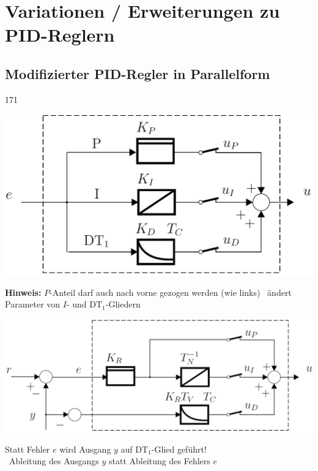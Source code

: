\section{Variationen / Erweiterungen zu PID-Reglern}

\subsection{Modifizierter PID-Regler in Parallelform}{171}

\begin{minipage}[t]{0.4\columnwidth}
    \begin{center}
        \textbf{}
    \end{center}
    \includegraphics[width=\columnwidth]{images/pid_regler_aufbau.png}

    \textbf{Hinweis:} $P$-Anteil darf auch nach vorne gezogen werden (wie links) 
    \textrightarrow\ ändert Parameter von $I$- und $\text{DT}_1$-Gliedern
\end{minipage}
\hfill
\begin{minipage}[t]{0.55\columnwidth}
    \begin{center}
        \textbf{}
    \end{center}
    \includegraphics[width=\columnwidth]{images/modifizierter_pid_regler.png}

    Statt Fehler $e$ wird Ausgang $y$ auf $\text{DT}_1$-Glied geführt! \\
    \textrightarrow\ Ableitung des Ausgangs $y$ statt Ableitung des Fehlers $e$
\end{minipage}


